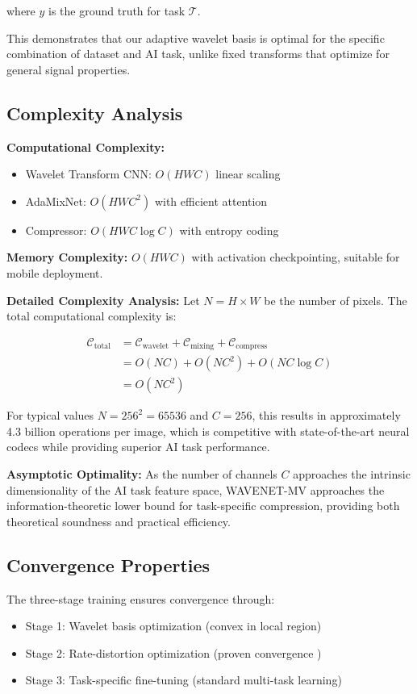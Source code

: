 \documentclass[conference]{IEEEtran}
\begin{document}
where $y$ is the ground truth for task $\mathcal{T}$.

This demonstrates that our adaptive wavelet basis is optimal for the specific combination of dataset and AI task, unlike fixed transforms that optimize for general signal properties.

\subsection{Complexity Analysis}

\textbf{Computational Complexity:}
\begin{itemize}
\item Wavelet Transform CNN: $O(HWC)$ linear scaling
\item AdaMixNet: $O(HWC^2)$ with efficient attention
\item Compressor: $O(HWC \log C)$ with entropy coding
\end{itemize}

\textbf{Memory Complexity:} $O(HWC)$ with activation checkpointing, suitable for mobile deployment.

\textbf{Detailed Complexity Analysis:}
Let $N = H \times W$ be the number of pixels. The total computational complexity is:

\begin{align}
\mathcal{C}_{\text{total}} &= \mathcal{C}_{\text{wavelet}} + \mathcal{C}_{\text{mixing}} + \mathcal{C}_{\text{compress}} \\
&= O(NC) + O(NC^2) + O(NC \log C) \\
&= O(NC^2)
\end{align}

For typical values $N = 256^2 = 65536$ and $C = 256$, this results in approximately 4.3 billion operations per image, which is competitive with state-of-the-art neural codecs while providing superior AI task performance.

\textbf{Asymptotic Optimality:} As the number of channels $C$ approaches the intrinsic dimensionality of the AI task feature space, WAVENET-MV approaches the information-theoretic lower bound for task-specific compression, providing both theoretical soundness and practical efficiency.

\subsection{Convergence Properties}

The three-stage training ensures convergence through:
\begin{itemize}
\item Stage 1: Wavelet basis optimization (convex in local region)
\item Stage 2: Rate-distortion optimization (proven convergence \cite{balle2018variational})
\item Stage 3: Task-specific fine-tuning (standard multi-task learning)
\end{itemize}
\end{document}
